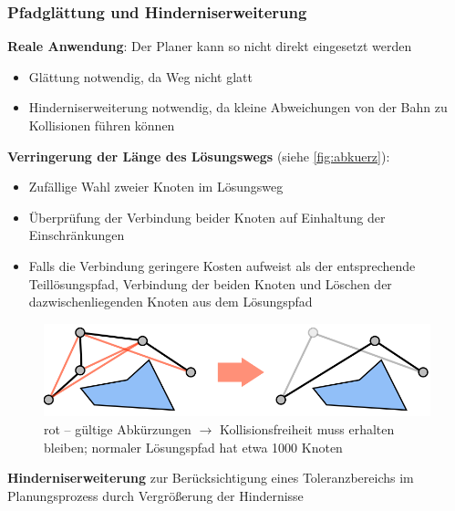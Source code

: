 \subsubsection*{Pfadglättung und Hinderniserweiterung}
\textbf{Reale Anwendung}: Der Planer kann so nicht direkt eingesetzt werden
\begin{itemize}
\item Glättung notwendig, da Weg nicht glatt
\item Hinderniserweiterung notwendig, da kleine Abweichungen von der Bahn zu Kollisionen führen können
\end{itemize}
\textbf{Verringerung der Länge des Lösungswegs} (siehe \autoref{fig:abkuerz}):
\begin{itemize}
\item Zufällige Wahl zweier Knoten im Lösungsweg
\item Überprüfung der Verbindung beider Knoten auf Einhaltung der Einschränkungen
\item Falls die Verbindung geringere Kosten aufweist als der entsprechende Teillösungspfad, Verbindung der beiden Knoten und Löschen der dazwischenliegenden Knoten aus dem Lösungspfad
\end{itemize}
\begin{figure}[h!]
	\centering
	\includegraphics[width=.5\textwidth]{figures/ch04_abkuerz.png}
	\caption{rot -- g\"{u}ltige Abk\"{u}rzungen  $\rightarrow$ Kollisionsfreiheit muss erhalten bleiben; normaler Lösungspfad hat etwa 1000 Knoten}
	\label{fig:abkuerz}
\end{figure}
\textbf{Hinderniserweiterung} zur Berücksichtigung eines Toleranzbereichs im Planungsprozess durch Vergrößerung der Hindernisse
